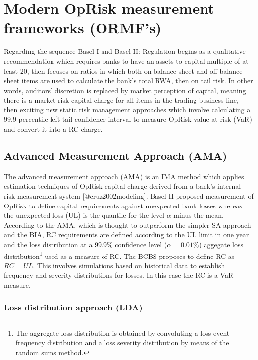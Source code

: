 \documentclass[
]{article}
\begin{document}
\section{Modern OpRisk measurement frameworks (ORMF's)}
\label{sec:Modern OpRisk measurement frameworks (ORMF's)}

Regarding the sequence Basel I and Basel II: Regulation begins as a
qualitative recommendation which requires banks to have an
assets-to-capital multiple of at least 20, then focuses on ratios in
which both on-balance sheet and off-balance sheet items are used to
calculate the bank's total RWA, then on tail risk. In other words,
auditors' discretion is replaced by market perception of capital,
meaning there is a market risk capital charge for all items in the
trading business line, then exciting new static risk management
approaches which involve calculating a 99.9 percentile left tail
confidence interval to measure OpRisk value-at-risk (VaR) and convert it
into a RC charge.\medskip

\subsection{Advanced Measurement Approach (AMA)}
\label{sec:Advanced Measurement Approach (AMA)}

The advanced measurement approach (AMA) is an IMA method which applies
estimation techniques of OpRisk capital charge derived from a bank's
internal risk measurement system {[}@cruz2002modeling{]}. Basel II
proposed measurement of OpRisk to define capital requirements against
unexpected bank losses whereas the unexpected loss (UL) is the quantile
for the level \(\alpha\) minus the mean. According to the AMA, which is
thought to outperform the simpler SA approach and the BIA, RC
requirements are defined according to the UL limit in one year and the
loss distribution at a 99.9\% confidence level (\(\alpha = 0.01\%\))
aggegate loss
distribution\footnote{The aggregate loss distribution is obtained by convoluting a loss event frequency distribution and a loss severity distribution by means of the random sums method.}
used as a measure of RC. The BCBS proposes to define RC as \(RC = UL\).
This involves simulations based on historical data to establish
frequency and severity distributions for losses. In this case the RC is
a VaR measure.\medskip

\subsubsection{Loss distribution approach (LDA)}
\label{sssec:Loss distribution approach (LDA)}
\end{document}
